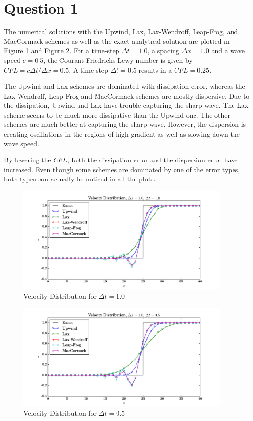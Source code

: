 \documentclass[letterpaper,12pt,]{article}
\begin{document}


\section*{Question 1}

The numerical solutions with the Upwind, Lax, Lax-Wendroff, Leap-Frog, and MacCormack schemes as well as the exact analytical solution are plotted in Figure \ref{fig:q11} and Figure \ref{fig:q12}.
For a time-step $\Delta t = 1.0$, a spacing $\Delta x = 1.0$ and a wave speed $c=0.5$, the Courant-Friedrichs-Lewy number is given by $CFL = c \Delta t / \Delta x = 0.5$.
A time-step $\Delta t = 0.5$ results in a $CFL = 0.25$.

The Upwind and Lax schemes are dominated with dissipation error, whereas the Lax-Wendroff, Leap-Frog and MacCormack schemes are mostly dispersive.
Due to the dissipation, Upwind and Lax have trouble capturing the sharp wave. The Lax scheme seems to be much more dissipative than the Upwind one.
The other schemes are much better at capturing the sharp wave.
However, the dispersion is creating oscillations in the regions of high gradient as well as slowing down the wave speed.

By lowering the $CFL$, both the dissipation error and the dispersion error have increased.
Even though some schemes are dominated by one of the error types, both types can actually be noticed in all the plots.

\begin{figure}[!h]
    \centering
    \includegraphics[width = 0.95\textwidth]{./Figures/q1_1}
    \caption{Velocity Distribution for $\Delta t = 1.0$}
    \label{fig:q11}
\end{figure}
\begin{figure}[!h]
    \centering
    \includegraphics[width = 0.95\textwidth]{./Figures/q1_2}
    \caption{Velocity Distribution for $\Delta t = 0.5$}
    \label{fig:q12}
\end{figure}
\end{document}
